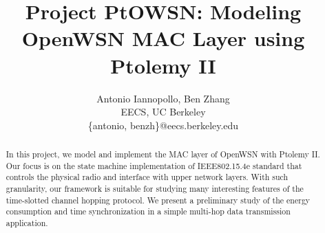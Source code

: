 \documentclass[9pt,twocolumn]{article}
\begin{document}
\title{Project PtOWSN: Modeling OpenWSN MAC Layer using Ptolemy II}

\author{
  Antonio Iannopollo, Ben Zhang\\
  EECS, UC Berkeley\\
  \{antonio, benzh\}@eecs.berkeley.edu
}

\maketitle
\thispagestyle{empty}

\begin{abstract}
In this project, we model and implement the MAC layer of OpenWSN with Ptolemy II. Our focus is on the state machine implementation of IEEE802.15.4e standard that controls the physical radio and interface with upper network layers. With such granularity, our framework is suitable for studying many interesting features of the time-slotted channel hopping protocol. We present a preliminary study of the energy consumption and time synchronization in a simple multi-hop data transmission application. 
\end{abstract}











\end{document}
